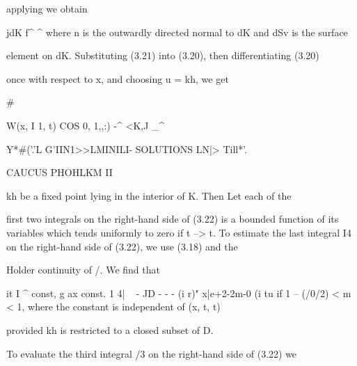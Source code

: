 applying we obtain

\begin{ocrformula}
(3.21)                wv-{x, t; e, t) cos {n, shch) dSv +                                    wv-*(x, t; x, t) ax
\end{ocrformula}

jdK f\textasciicircum{} \textasciicircum{} where n is the outwardly directed normal to dK and dSv is the surface

\begin{ocrformula}
element on dK. Substituting     (3.21) into (3.20), then differentiating (3.20)
\end{ocrformula}

once with respect to x, and choosing u = kh, we get

\#

\begin{ocrformula}
W(x,       I 1, t) COS 0, 1,,:)
\JBK    -^                                  <K,J            _^
\end{ocrformula}

\begin{ocrformula}
Y*#('.'L              G'IIN1>>LMINILI- SOLUTIONS           LN|> Till*'.
\end{ocrformula}

CAUCUS PHOHLKM II

kh be a fixed point lying in the interior of K. Then Let each of the

\begin{ocrformula}
first two integrals on the right-hand   side of (3.22) is a bounded    function
of its variables which  tends uniformly    to zero if t --> t. To estimate    the
last integral I4 on the right-hand  side of (3.22), we                                use       (3.18) and    the
\end{ocrformula}

Holder continuity of /. We find that

\begin{ocrformula}
it I ^    const,    g                 ax                  const.
1 4| ~      -      JD    -                           -      -
(i    r)"    \x            x|e+2-2m-0           (i    tu
if 1 --   (/0/2) < m < 1, where      the constant   is independent                                   of    (x, t, t)
\end{ocrformula}

provided kh is restricted to a closed subset of D.

\begin{ocrformula}
To    evaluate   the third integral /3 on               the right-hand           side of (3.22) we
\end{ocrformula}

